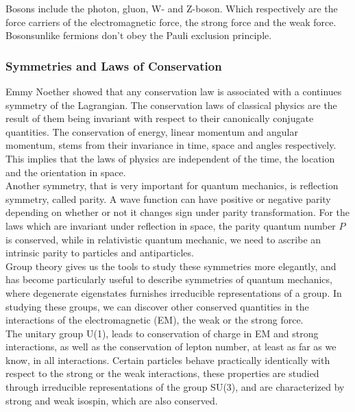 \documentclass[11pt,a4paper]{article}
\begin{document}
Bosons include the photon, gluon, W- and Z-boson. Which respectively are the
force carriers of the electromagnetic force, the strong force and the weak
force. Bosonsunlike fermions don't obey the Pauli exclusion principle.

\subsubsection{Symmetries and Laws of Conservation} Emmy Noether showed that any
conservation law is associated with a continues symmetry of the Lagrangian. The
conservation laws of classical physics are the result of them being invariant
with respect to their canonically conjugate quantities. The conservation of
energy, linear momentum and angular momentum, stems from their invariance in
time, space and angles respectively. This implies that the laws of physics are
independent of the time, the location and the orientation in space.\\

Another symmetry, that is very important for quantum mechanics, is reflection
symmetry, called parity. A wave function can have positive or negative parity
depending on whether or not it changes sign under parity transformation. For the
laws which are invariant under reflection in space, the parity quantum number
$P$ is conserved, while in relativistic quantum mechanic, we need to ascribe an
intrinsic parity to particles and antiparticles.\\

Group theory gives us the tools to study these symmetries more elegantly, and
has become particularly useful to describe symmetries of quantum mechanics,
where degenerate eigenstates furnishes irreducible representations of a group.
In studying these groups, we can discover other conserved quantities in the
interactions of the electromagnetic (EM), the weak or the strong force. \\

The unitary group U(1), leads to conservation of charge in EM and strong
interactions, as well as the conservation of lepton number, at least as far as
we know, in all interactions. Certain particles behave practically identically
with respect to the strong or the weak interactions, these properties are
studied through irreducible representations of the group SU(3), and are
characterized by strong and weak isospin, which are also conserved.
\end{document}
